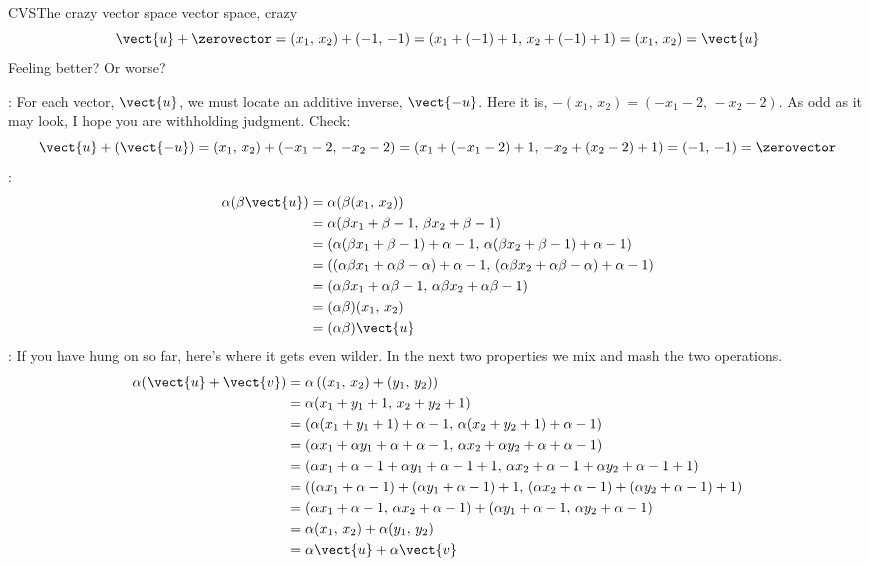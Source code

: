 \begin{example}{CVS}{The crazy vector space }{vector space, crazy}
\begin{equation*}
%
\vect{u}+\zerovector=(x_1,\,x_2)+(-1,\,-1)=(x_1+(-1)+1,\,x_2+(-1)+1)=(x_1,\,x_2)=\vect{u}
%
\end{equation*}
%
Feeling better?  Or worse?\par
%
:  For each vector, $\vect{u}$, we must locate an additive inverse, $\vect{-u}$.  Here it is, $-(x_1,\,x_2)=(-x_1-2,\,-x_2-2)$.  As odd as it may look, I hope you are withholding judgment.  Check:
%
\begin{equation*}
\vect{u}+ (\vect{-u})=(x_1,\,x_2)+(-x_1-2,\,-x_2-2)=(x_1+(-x_1-2)+1,\,-x_2+(x_2-2)+1)=(-1,\,-1)=\zerovector
\end{equation*}
%
:
%
\begin{align*}
\alpha(\beta\vect{u})
&=\alpha(\beta(x_1,\,x_2))\\
&=\alpha(\beta x_1+\beta-1,\,\beta x_2+\beta-1)\\
&=(\alpha(\beta x_1+\beta-1)+\alpha-1,\,\alpha(\beta x_2+\beta-1)+\alpha-1)\\
&=((\alpha\beta x_1+\alpha\beta-\alpha)+\alpha-1,\,(\alpha\beta x_2+\alpha\beta-\alpha)+\alpha-1)\\
&=(\alpha\beta x_1+\alpha\beta-1,\,\alpha\beta x_2+\alpha\beta-1)\\
&=(\alpha\beta)(x_1,\,x_2)\\
&=(\alpha\beta)\vect{u}
\end{align*}
%
:  If you have hung on so far, here's where it gets even wilder.  In the next two properties we mix and mash the two operations.
%
\begin{align*}
\alpha(\vect{u}+\vect{v})&=\alpha\left((x_1,\,x_2)+(y_1,\,y_2)\right)\\
&=\alpha(x_1+y_1+1,\,x_2+y_2+1)\\
&=(\alpha(x_1+y_1+1)+\alpha-1,\,\alpha(x_2+y_2+1)+\alpha-1)\\
&=(\alpha x_1+\alpha y_1+\alpha+\alpha-1,\,\alpha x_2+\alpha y_2+\alpha+\alpha-1)\\
&=(\alpha x_1+\alpha-1+\alpha y_1+\alpha-1+1,\,\alpha x_2+\alpha-1+\alpha y_2+\alpha-1+1)\\
&=((\alpha x_1+\alpha-1)+(\alpha y_1+\alpha-1)+1,\,(\alpha x_2+\alpha-1)+(\alpha y_2+\alpha-1)+1)\\
&=(\alpha x_1+\alpha-1,\,\alpha x_2+\alpha-1)+(\alpha y_1+\alpha-1,\,\alpha y_2+\alpha-1)\\
&=\alpha(x_1,\,x_2)+\alpha(y_1,\,y_2)\\
&=\alpha\vect{u}+\alpha\vect{v}
\end{align*}

\end{example}
